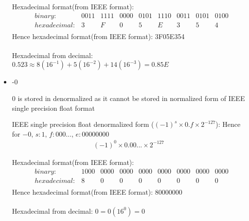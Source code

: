 \documentclass{article}
\begin{document}
\begin{itemize}
  Hexadecimal format(from IEEE format):
  \begin{align*}
    &binary: & 0011 & 1111 & 0000 & 0101 & 1110 & 0011 & 0101 & 0100\\
    &hexadecimal: & 3 & F  & 0    & 5    & E    & 3    & 5    & 4   \\
  \end{align*}
  Hence hexadecimal format(from IEEE format): 3F05E354\\\\
  Hexadecimal from decimal: $0.523 \approx 8(16^{-1}) + 5(16^{-2}) + 14(16^{-3}) = 0.85E$
\newline\newline

\item -0 \newline
  
  0 is stored in denormalized as it cannot be stored in normalized form
  of IEEE single precision float format

  IEEE single precision float denormalized form ($(-1)^s \times 0.f \times 2^{-127}$):
  Hence for $-0$, $s: 1$, $f: 000...$, $e: 00000000$
  \begin{align*}
    (-1)^0 \times 0.00... \times 2^{-127}
  \end{align*}

  Hexadecimal format(from IEEE format):
  \begin{align*}
    &binary: & 1000 & 0000 & 0000 & 0000 & 0000 & 0000 & 0000 & 0000\\
    &hexadecimal: & 8 & 0  & 0    & 0    & 0    & 0    & 0    & 0   \\
  \end{align*}
  Hence hexadecimal format(from IEEE format): 80000000\\\\
  Hexadecimal from decimal: $0 = 0(16^0) = 0$
\end{itemize}
\end{document}
